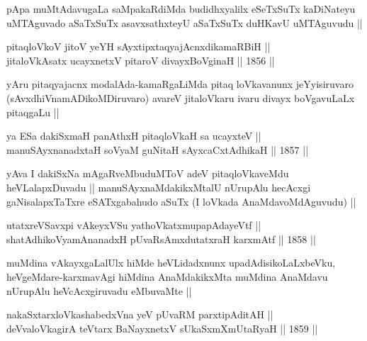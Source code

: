 \begin{artha}
pApa muMtAdavugaLa saMpakaRdiMda budidhxyalilx eSeTxSuTx kaDiNateyu
uMTAguvado aSaTxSuTx asavxsathxteyU aSaTxSuTx duHKavU uMTAguvudu ||
\end{artha}


\begin{shl}
pitaqloVkoV jitoV yeYH sAyxtipxtaqyajAcnxdikamaRBiH || \\
jitaloVkAsatx ucayxnetxV pitaroV divayxBoVginaH ||  1856 ||  
\end{shl}

\begin{artha}
yAru pitaqyajacnx modalAda-kamaRgaLiMda pitaq loVkavanunx
jeYyisiruvaro (sAvxdhiVnamADikoMDiruvaro) avareV jitaloVkaru ivaru
divayx boVgavuLaLx pitaqgaLu ||
\end{artha}


\begin{shl}
ya ESa dakiSxmaH panAthxH pitaqloVkaH sa ucayxteV ||  \\
manuSAyxnanadxtaH soV\s yaM guNitaH sAyxcaCxtAdhikaH ||  1857 ||  
\end{shl}

\begin{artha}
yAva I dakiSxNa mAgaRveMbuduMToV adeV pitaqloVkaveMdu heVLalapxDuvadu
|| manuSAyxnaMdakikxMtalU nUrupAlu hecAcxgi gaNisalapxTaTxre
eSATxgabahudo aSuTx (I loVkada AnaMdavoMdAguvudu) ||
\end{artha}


\begin{shl}
utatxreVSavxpi vAkeyxVSu yathoVkatxmupapAdayeVtf || \\
shatAdhikoV\s yamAnanadxH pUvaRsAmxdutatxraH karxmAtf ||  1858 ||  
\end{shl}

\begin{artha}
muMdina vAkayxgaLalUlx hiMde heVLidadxnunx upadAdisikoLaLxbeVku,
heVgeMdare-karxmavAgi hiMdina AnaMdakikxMta muMdina AnaMdavu nUrupAlu
heVcAcxgiruvadu eMbuvaMte ||
\end{artha}


\begin{shl}
nakaSxtarxloVkashabedxVna yeV pUvaRM parxtipAditAH ||  \\
deVvaloVkagirA teV\s tarx BaNayxnetxV sUkaSxmXmUtaRyaH ||  1859 ||  
\end{shl}

